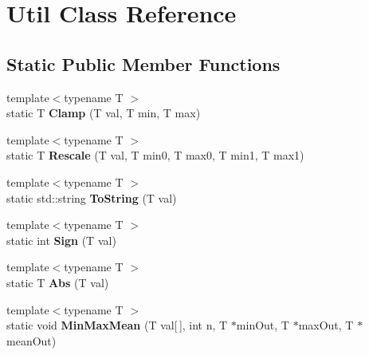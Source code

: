 \hypertarget{class_util}{\section{\-Util \-Class \-Reference}
\label{class_util}
}
\subsection*{\-Static \-Public \-Member \-Functions}
\begin{DoxyCompactItemize}
\item 
\hypertarget{class_util_ae96fb04ebf846f501ebd96d7455027a9}{{\footnotesize template$<$typename T $>$ }\\static \-T {\bfseries \-Clamp} (\-T val, \-T min, \-T max)}\label{class_util_ae96fb04ebf846f501ebd96d7455027a9}

\item 
\hypertarget{class_util_a104bdc57a1eba1e8863f8139985e9b05}{{\footnotesize template$<$typename T $>$ }\\static \-T {\bfseries \-Rescale} (\-T val, \-T min0, \-T max0, \-T min1, \-T max1)}\label{class_util_a104bdc57a1eba1e8863f8139985e9b05}

\item 
\hypertarget{class_util_a120427fa00fd2e48bcc5b48088aeef84}{{\footnotesize template$<$typename T $>$ }\\static std\-::string {\bfseries \-To\-String} (\-T val)}\label{class_util_a120427fa00fd2e48bcc5b48088aeef84}

\item 
\hypertarget{class_util_ae608455719c51e7478f56a1366f50a1e}{{\footnotesize template$<$typename T $>$ }\\static int {\bfseries \-Sign} (\-T val)}\label{class_util_ae608455719c51e7478f56a1366f50a1e}

\item 
\hypertarget{class_util_a1e847664f26f1a545b1c8414ec8bbc90}{{\footnotesize template$<$typename T $>$ }\\static \-T {\bfseries \-Abs} (\-T val)}\label{class_util_a1e847664f26f1a545b1c8414ec8bbc90}

\item 
\hypertarget{class_util_a2a09028ede419c2da1f1e308fa811a73}{{\footnotesize template$<$typename T $>$ }\\static void {\bfseries \-Min\-Max\-Mean} (\-T val\mbox{[}$\,$\mbox{]}, int n, \-T $\ast$min\-Out, \-T $\ast$max\-Out, \-T $\ast$mean\-Out)}\label{class_util_a2a09028ede419c2da1f1e308fa811a73}


\end{DoxyCompactItemize}
